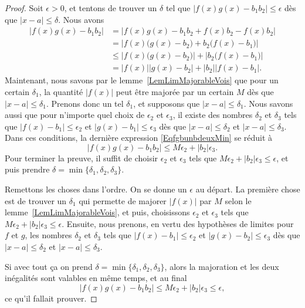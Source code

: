 \begin{proof}
	Soit \( \epsilon>0\), et tentons de trouver un \( \delta\) tel que \( | f(x)g(x)-b_1b_2 |\leq \epsilon\) dès que \( | x-a |\leq \delta\). Nous avons
	\begin{equation}    \label{EqfgbunbdeuxMin}
		\begin{split}
			| f(x)g(x)-b_1b_2 |&=|  f(x)g(x)-b_1b_2 +f(x)b_2-f(x)b_2 |\\
			&=\left|   f(x)\big( g(x)-b_2 \big)+b_2\big( f(x)-b_1 \big)    \right|\\
			&\leq \left|  f(x)\big( g(x)-b_2 \big)  \right|+\left| b_2\big( f(x)-b_1 \big) \right| \\
			&= | f(x) | | g(x)-b_2  |+| b_2 | |f(x)-b_1 |.
		\end{split}
	\end{equation}
	Maintenant, nous savons par le lemme~\ref{LemLimMajorableVois} que pour un certain \( \delta_1\), la quantité \( | f(x) |\) peut être majorée par un certain \( M\) dès que \( | x-a |\leq \delta_1\). Prenons donc un tel \( \delta_1\), et supposons que \( | x-a |\leq \delta_1\). Nous savons aussi que pour n'importe quel choix de \( \epsilon_2\) et \( \epsilon_3\), il existe des nombres \( \delta_2\) et \( \delta_3\) tels que \( | f(x)-b_1 |\leq \epsilon_2\) et \( | g(x)-b_1 |\leq \epsilon_3\) dès que \( | x-a |\leq\delta_2\) et \( | x-a |\leq\delta_3\). Dans ces conditions, la dernière expression \eqref{EqfgbunbdeuxMin} se réduit à
	\begin{equation}
		| f(x)g(x)-b_1b_2 |\leq M\epsilon_2+| b_2 |\epsilon_3.
	\end{equation}
	Pour terminer la preuve, il suffit de choisir \( \epsilon_2\) et \( \epsilon_3\) tels que \( M\epsilon_2+| b_2 |\epsilon_3\leq\epsilon\), et puis prendre \( \delta=\min\{ \delta_1,\delta_2,\delta_3 \}\).

	Remettons les choses dans l'ordre. On se donne un \( \epsilon\) au départ. La première chose est de trouver un \( \delta_1\) qui permette de majorer \( |f(x)|\) par \( M\) selon le lemme~\ref{LemLimMajorableVois}, et puis, choisissons \( \epsilon_2\) et \( \epsilon_3\) tels que \( M\epsilon_2+| b_2 |\epsilon_3\leq\epsilon\). Ensuite, nous prenons, en vertu des hypothèses de limites pour \( f\) et \( g\), les nombres \( \delta_2\) et \( \delta_3\) tels que \( | f(x)-b_1 |\leq \epsilon_2\) et \( | g(x)-b_2 |\leq \epsilon_3\) dès que \( | x-a |\leq \delta_2\) et \( | x-a |\leq \delta_3\).

	Si avec tout ça on prend \( \delta=\min\{ \delta_1,\delta_2,\delta_3 \}\), alors la majoration et les deux inégalités sont valables en même temps, et au final
	\[
		| f(x)g(x)-b_1b_2 |\leq M\epsilon_2+|b_2|\epsilon_3 \leq \epsilon,
	\]
	ce qu'il fallait prouver.
\end{proof}

